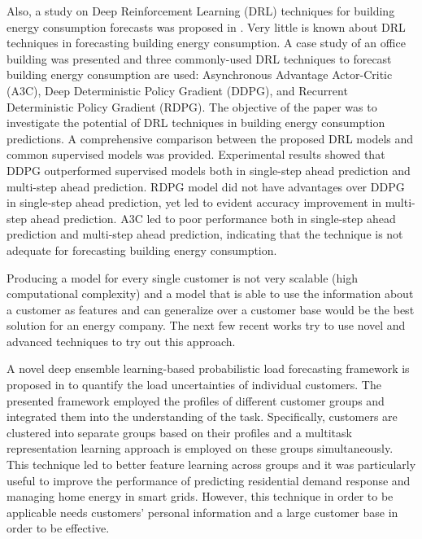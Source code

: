 Also, a study on Deep Reinforcement Learning (DRL) techniques for building energy consumption forecasts was proposed in \cite{LIU2020109675}.
Very little is known about DRL techniques in forecasting building energy consumption.
A case study of an office building was presented and three commonly-used DRL techniques to forecast building energy consumption are used: Asynchronous Advantage Actor-Critic (A3C), Deep Deterministic Policy Gradient (DDPG), and Recurrent Deterministic Policy Gradient (RDPG).
The objective of the paper was to investigate the potential of DRL techniques in building energy consumption predictions.
A comprehensive comparison between the proposed DRL models and common supervised models was provided.
Experimental results showed that DDPG outperformed supervised models both in single-step ahead prediction and multi-step ahead prediction.
RDPG model did not have advantages over DDPG in single-step ahead prediction, yet led to evident accuracy improvement in multi-step ahead prediction.
A3C led to poor performance both in single-step ahead prediction and multi-step ahead prediction, indicating that the technique is not adequate for forecasting building energy consumption.

Producing a model for every single customer is not very scalable (high computational complexity) and a model that is able to use the information about a customer as features and can generalize over a customer base would be the best solution for an energy company.
The next few recent works try to use novel and advanced techniques to try out this approach.

A novel deep ensemble learning-based probabilistic load forecasting framework is proposed in \cite{YANG2019116324} to quantify the load uncertainties of individual customers.
The presented framework employed the profiles of different customer groups and integrated them into the understanding of the task.
Specifically, customers are clustered into separate groups based on their profiles and a multitask representation learning approach is employed on these groups simultaneously.
This technique led to better feature learning across groups and it was particularly useful to improve the performance of predicting residential demand response and managing home energy in smart grids.
However, this technique in order to be applicable needs customers’ personal information and a large customer base in order to be effective.

